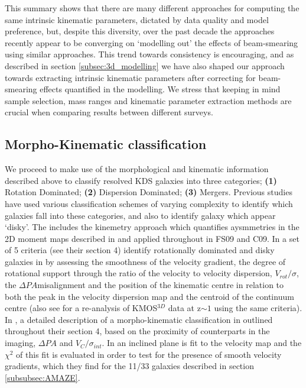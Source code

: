 \documentclass[fleqn,usenatbib]{mn2e}
\begin{document}
 
This summary shows that there are many different approaches for computing the same intrinsic kinematic parameters, dictated by data quality and model preference, but, despite this diversity, over the past decade the approaches recently appear to be converging on `modelling out' the effects of beam-smearing using similar approaches.
This trend towards consistency is encouraging, and as described in section \cref{subsec:3d_modelling} we have also shaped our approach towards extracting intrinsic kinematic parameters after correcting for beam-smearing effects quantified in the modelling.
We stress that keeping in mind sample selection, mass ranges and kinematic parameter extraction methods are crucial when comparing results between different surveys.

\subsection{Morpho-Kinematic classification}\label{subsec:morpho-kin-class}
We proceed to make use of the morphological and kinematic information described above to classify resolved KDS galaxies into three categories; \textbf{(1)} Rotation Dominated; \textbf{(2)} Dispersion Dominated; \textbf{(3)} Mergers.
Previous studies have used various classification schemes of varying complexity to identify which galaxies fall into these categories, and also to identify galaxy which appear `disky'.
The includes the kinemetry approach which quantifies aysmmetries in the 2D moment maps described in \cite{Shapiro2008} and applied throughout in FS09 and C09.
In \cite{Wisnioski2015} a set of 5 criteria (see their section 4) identify rotationally dominated and disky galaxies in by assessing the smoothness of the velocity gradient, the degree of rotational support through the ratio of the velocity to velocity dispersion, $V_{rot}/\sigma$, the $\Delta PA$misalignment and the position of the kinematic centre in relation to both the peak in the velocity dispersion map and the centroid of the continuum centre (also see \cite{Rodrigues2016} for a re-analysis of KMOS$^{3D}$ data at z$\sim 1$ using the same criteria).   
In \cite{Epinat2012}, a detailed description of a morpho-kinematic classification in outlined throughout their section 4, based on the proximity of counterparts in the imaging, $\Delta PA$ and $V_{C}/\sigma_{int}$.
In \cite{Gnerucci2011} an inclined plane is fit to the velocity map and the $\chi^{2}$ of this fit is evaluated in order to test for the presence of smooth velocity gradients, which they find for the 11/33 galaxies described in section \cref{subsubsec:AMAZE}.
\end{document}
